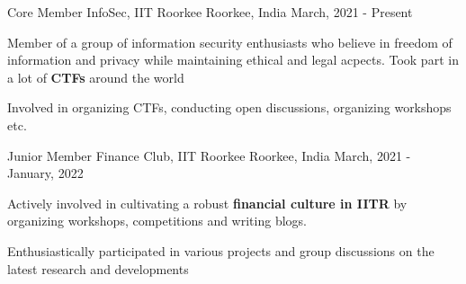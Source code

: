\begin{cventries}
\cventry
{Core Member} %
{InfoSec, IIT Roorkee} %
{Roorkee, India} %
{March, 2021 - Present} %
{
	\begin{cvitems} %
		\item {Member of a group of information security enthusiasts who believe in freedom of information and privacy while maintaining ethical and legal acpects. Took part in a lot of \textbf{CTFs} around the world}
		\item {Involved in organizing CTFs, conducting open discussions, organizing workshops etc.}
	\end{cvitems}
}



 \cventry
{Junior Member} %
{Finance Club, IIT Roorkee} %
{Roorkee, India} %
{March, 2021 - January, 2022} %
{
	\begin{cvitems} %
		\item {Actively involved in cultivating a robust \textbf{financial culture in IITR} by organizing workshops, competitions and writing blogs.}
		\item {Enthusiastically participated in various projects and group discussions on the latest research and developments}
	\end{cvitems}
}

\end{cventries}
